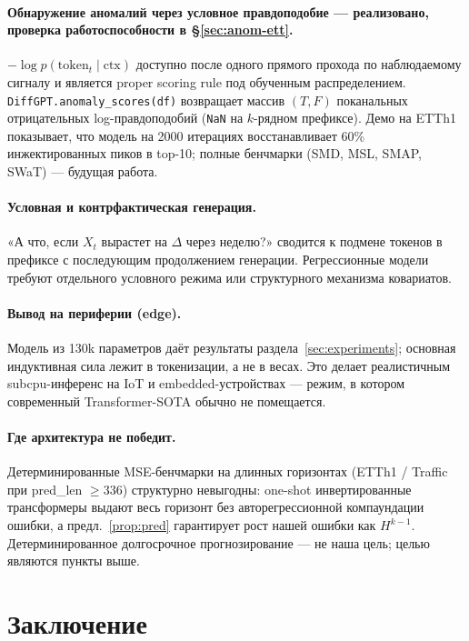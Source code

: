 \documentclass[11pt]{article}
\theoremstyle{remark}
\begin{document}
\paragraph{Обнаружение аномалий через условное правдоподобие ---
реализовано, проверка работоспособности в \S\ref{sec:anom-ett}.}
$-\log p(\text{token}_t \mid \mathrm{ctx})$ доступно после одного
прямого прохода по наблюдаемому сигналу и является proper scoring
rule под обученным распределением. \texttt{DiffGPT.anomaly\_scores(df)}
возвращает массив $(T, F)$ поканальных отрицательных log-правдоподобий
(\texttt{NaN} на $k$-рядном префиксе). Демо на ETTh1 показывает, что
модель на 2000 итерациях восстанавливает 60\% инжектированных пиков в
top-10; полные бенчмарки (SMD, MSL, SMAP, SWaT) --- будущая работа.

\paragraph{Условная и контрфактическая генерация.}
«А что, если $X_t$ вырастет на $\Delta$ через неделю?» сводится к
подмене токенов в префиксе с последующим продолжением генерации.
Регрессионные модели требуют отдельного условного режима или
структурного механизма ковариатов.

\paragraph{Вывод на периферии (edge).}
Модель из 130k параметров даёт результаты раздела~\ref{sec:experiments};
основная индуктивная сила лежит в токенизации, а не в весах. Это делает
реалистичным subcpu-инференс на IoT и embedded-устройствах ---
режим, в котором современный Transformer-SOTA обычно не помещается.

\paragraph{Где архитектура не победит.}
Детерминированные MSE-бенчмарки на длинных горизонтах (ETTh1 / Traffic
при pred\_len $\ge 336$) структурно невыгодны: one-shot инвертированные
трансформеры выдают весь горизонт без авторегрессионной компаундации
ошибки, а предл.~\ref{prop:pred} гарантирует рост нашей ошибки как
$H^{k-1}$. Детерминированное долгосрочное прогнозирование --- не наша
цель; целью являются пункты выше.

\section{Заключение}
\end{document}
